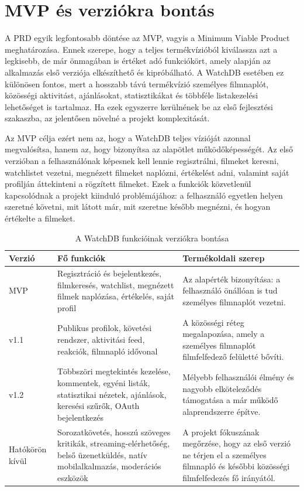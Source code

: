 \section{MVP és verziókra bontás}

A PRD egyik legfontosabb döntése az MVP, vagyis a Minimum Viable Product meghatározása. Ennek szerepe, hogy a teljes termékvízióból kiválassza azt a legkisebb, de már önmagában is értéket adó funkciókört, amely alapján az alkalmazás első verziója elkészíthető és kipróbálható. A WatchDB esetében ez különösen fontos, mert a hosszabb távú termékvízió személyes filmnaplót, közösségi aktivitást, ajánlásokat, statisztikákat és többféle listakezelési lehetőséget is tartalmaz. Ha ezek egyszerre kerülnének be az első fejlesztési szakaszba, az jelentősen növelné a projekt komplexitását.

Az MVP célja ezért nem az, hogy a WatchDB teljes vízióját azonnal megvalósítsa, hanem az, hogy bizonyítsa az alapötlet működőképességét. Az első verzióban a felhasználónak képesnek kell lennie regisztrálni, filmeket keresni, watchlistet vezetni, megnézett filmeket naplózni, értékelést adni, valamint saját profilján áttekinteni a rögzített filmeket. Ezek a funkciók közvetlenül kapcsolódnak a projekt kiinduló problémájához: a felhasználó egyetlen helyen szeretné követni, mit látott már, mit szeretne később megnézni, és hogyan értékelte a filmeket.

\begin{table}[H]
\centering
\renewcommand{\arraystretch}{1.25}
\begin{tabular}{|p{}|p{}|p{}|}
\hline
\textbf{Verzió} & \textbf{Fő funkciók} & \textbf{Termékoldali szerep} \\
\hline
MVP & Regisztráció és bejelentkezés, filmkeresés, watchlist, megnézett filmek naplózása, értékelés, saját profil & Az alapérték bizonyítása: a felhasználó önállóan is tud személyes filmnaplót vezetni. \\
\hline
v1.1 & Publikus profilok, követési rendszer, aktivitási feed, reakciók, filmnapló idővonal & A közösségi réteg megalapozása, amely a személyes filmnaplót filmfelfedező felületté bővíti. \\
\hline
v1.2 & Többszöri megtekintés kezelése, kommentek, egyéni listák, statisztikai nézetek, ajánlások, keresési szűrők, OAuth bejelentkezés & Mélyebb felhasználói élmény és nagyobb elköteleződés támogatása a már működő alaprendszerre építve. \\
\hline
Hatókörön kívül & Sorozatkövetés, hosszú szöveges kritikák, streaming-elérhetőség, belső üzenetküldés, natív mobilalkalmazás, moderációs eszközök & A projekt fókuszának megőrzése, hogy az első verzió ne térjen el a személyes filmnapló és későbbi közösségi filmfelfedezés fő irányától. \\
\hline
\end{tabular}
\caption{A WatchDB funkcióinak verziókra bontása}
\label{tab:watchdb-versioning}
\end{table}

